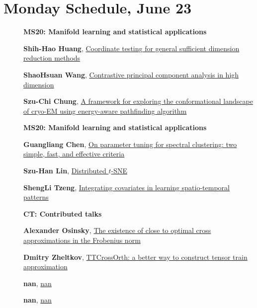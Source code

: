 \documentclass[ILAS2025-program.tex]{subfiles}
\begin{document}
\section*{Monday Schedule, June 23 }
        
        \begin{description}
    \item[] {\color{mstitle}\textbf{MS20: Manifold learning and statistical applications}} 
    \item[] \hypertarget{up0040}{}\textbf{Shih-Hao Huang}, \hyperlink{down0040}{Coordinate testing for general sufficient dimension reduction methods}
        \item[] \hypertarget{up0041}{}\textbf{ShaoHsuan Wang}, \hyperlink{down0041}{Contrastive principal component analysis in high dimension}
        \item[] \hypertarget{up0042}{}\textbf{Szu-Chi Chung}, \hyperlink{down0042}{A framework for exploring the conformational landscape of cryo-EM using energy-aware pathfinding algorithm}
        \end{description}
    \begin{description}
    \item[] {\color{mstitle}\textbf{MS20: Manifold learning and statistical applications}} 
    \item[] \hypertarget{up0073}{}\textbf{Guangliang Chen}, \hyperlink{down0073}{On parameter tuning for spectral clustering: two simple, fast, and effective criteria}
        \item[] \hypertarget{up0074}{}\textbf{Szu-Han Lin}, \hyperlink{down0074}{Distributed $t$-SNE}
        \item[] \hypertarget{up0075}{}\textbf{ShengLi Tzeng}, \hyperlink{down0075}{Integrating covariates in learning spatio-temporal patterns}
        \end{description}
    \begin{description}
    \item[] {\color{mstitle}\textbf{CT: Contributed talks}} 
    \item[] \hypertarget{up0116}{}\textbf{Alexander Osinsky}, \hyperlink{down0116}{The existence of close to optimal cross approximations in the Frobenius norm}
        \item[] \hypertarget{up0117}{}\textbf{Dmitry Zheltkov}, \hyperlink{down0117}{TTCrossOrth: a better way to construct tensor train approximation}
        \item[] \hypertarget{up0118}{}\textbf{nan}, \hyperlink{down0118}{nan}
        \item[] \hypertarget{up0119}{}\textbf{nan}, \hyperlink{down0119}{nan}
        \end{description}
    \newpage
\end{document}
